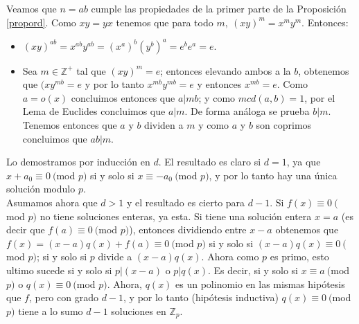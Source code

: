 \documentclass{report}
\begin{document}
\begin{myproof}
    Veamos que $n=ab$ cumple las propiedades de la primer parte de la Proposición \ref{propord}. Como $xy=yx$ tenemos que para todo $m,\ (xy)^m=x^my^m$. Entonces:
    \begin{itemize}
        \item $(xy)^{ab}=x^{ab}y^{ab}=(x^a)^b(y^b)^a=e^be^a=e$.
        \item Sea $m\in\mathbb{Z}^+$ tal que $(xy)^m=e$; entonces elevando ambos a la $b$, obtenemos que $(xy^{mb}=e$ y por lo tanto $x^{mb}y^{mb}=e$ y entonces $x^{mb}=e$. Como $a=o(x)$ concluimos entonces que $a|mb$; y como $mcd(a,b)=1$, por el Lema de Euclides concluimos que $a|m$. De forma análoga se prueba $b|m$. Tenemos entonces que $a$ y $b$ dividen a $m$ y como $a$ y $b$ son coprimos concluimos que $ab|m$.
    \end{itemize}
\end{myproof}
\begin{myproof}
    Lo demostramos por inducción en $d$. El resultado es claro si $d=1$, ya que $x+a_0\equiv 0\ ($mod $p)$ si y solo si $x\equiv -a_0\ ($mod $p)$, y por lo tanto hay una única solución modulo $p$.\\Asumamos ahora que $d>1$ y el resultado es cierto para $d-1$. Si $f(x)\equiv 0\ ($mod $p)$ no tiene soluciones enteras, ya esta. Si tiene una solución entera $x=a$ (es decir que $f(a)\equiv 0\ ($mod $p)$), entonces dividiendo entre $x-a$ obtenemos que $f(x)=(x-a)q(x)+f(a)\equiv 0\ ($mod $p)$ si y solo si $(x-a)q(x)\equiv 0\ ($mod $p)$; si y solo si $p$ divide a $(x-a)q(x)$. Ahora como $p$ es primo, esto ultimo sucede si y solo si $p|(x-a)$ o $p|q(x)$. Es decir, si y solo si $x\equiv a\ ($mod $p)$ o $q(x)\equiv 0\ ($mod $p)$. Ahora, $q(x)$ es un polinomio en las mismas hipótesis que $f$, pero con grado $d-1$, y por lo tanto (hipótesis inductiva) $q(x)\equiv 0\ ($mod $p)$ tiene a lo sumo $d-1$ soluciones en $\mathbb{Z}_p$.
\end{myproof}
\end{document}
